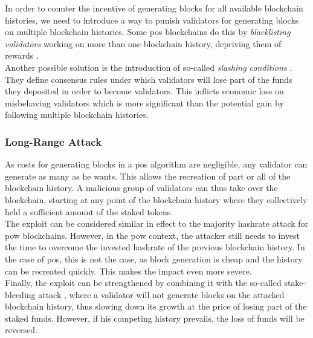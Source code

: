 \documentclass[12pt,a4paper]{article}
\begin{document}
In order to counter the incentive of generating \glspl{block} for all available blockchain histories, we need to introduce a way to punish \glspl{validator} for generating blocks on multiple blockchain histories. Some \acrshort{pos} \glspl{blockchain} do this by \textit{blacklisting \glspl{validator}} working on more than one blockchain history, depriving them of \glspl{reward} \cite{secure}.\\

Another possible solution is the introduction of so-called \textit{slashing conditions} \cite{casper}. They define consensus rules under which validators will lose part of the funds they deposited in order to become \glspl{validator}. This inflicts economic loss on misbehaving \glspl{validator} which is more significant than the potential gain by following multiple blockchain histories.\\

\subsubsection{Long-Range Attack}

As costs for generating \glspl{block} in a \acrshort{pos} algorithm are negligible, any \gls{validator} can generate as many as he wants. This allows the recreation of part or all of the blockchain history. A malicious group of \glspl{validator} can thus take over the \gls{blockchain}, starting at any point of the blockchain history where they collectively held a sufficient amount of the staked tokens.\\

The exploit can be considered similar in effect to the majority hashrate attack for \acrshort{pow} \glspl{blockchain}. However, in the \acrshort{pow} context, the attacker still needs to invest the time to overcome the invested \gls{hashrate} of the previous blockchain history. In the case of \acrshort{pos}, this is not the case, as block generation is cheap and the history can be recreated quickly. This makes the impact even more severe.\\

Finally, the exploit can be strengthened by combining it with the so-called stake-bleeding attack \cite{bleeding}, where a \gls{validator} will not generate \glspl{block} on the attacked blockchain history, thus slowing down its growth at the price of losing part of the staked funds. However, if his competing history prevails, the loss of funds will be reversed.\\
\end{document}

